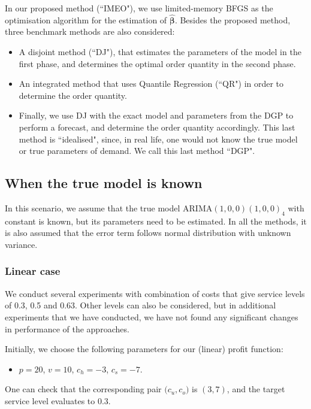 \documentclass{article}
\begin{document}
In our proposed method (``IMEO"), we use limited-memory BFGS \cite{LN89} as the optimisation algorithm for the estimation of $\hat{\boldsymbol{\beta}}$. Besides the proposed method, three benchmark methods are also considered:
\begin{itemize}
    \item A disjoint method (``DJ"), that estimates the parameters of the model in the first phase, and determines the optimal order quantity in the second phase.
    \item An integrated method that uses Quantile Regression (``QR") in order to determine the order quantity.
    \item Finally, we use DJ with the exact model and parameters from the DGP to perform a forecast, and determine the order quantity accordingly. This last method is ``idealised", since, in real life, one would not know the true model or true parameters of demand. We call this last method ``DGP".
\end{itemize}


\subsection{When the true model is known}
In this scenario, we assume that the true model ARIMA$(1,0,0)(1,0,0)_4$ with constant is known, but its parameters need to be estimated. In all the methods, it is also assumed that the error term follows normal distribution with unknown variance.

\subsubsection{Linear case} \label{sub:exp1}

We conduct several experiments with combination of costs that give service levels of 0.3, 0.5 and 0.63. Other levels can also be considered, but in additional experiments that we have conducted, we have not found any significant changes in performance of the approaches.

Initially, we choose the following parameters for our (linear) profit function:
\begin{itemize}
    \item $p=20$, $v=10$, $c_h=-3$, $c_s=-7$.
\end{itemize}
One can check that the corresponding pair $\big( c_u,c_o \big)$ is $(3,7)$, and the target service level evaluates to $0.3$.
\end{document}
